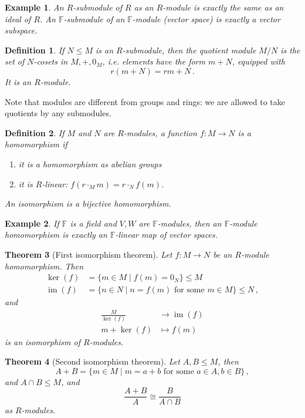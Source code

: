 \documentclass{article}
\theoremstyle{plain}\theoremheaderfont{\normalfont\itshape}\theorembodyfont{\rmfamily}\theoremseparator{.}\newtheorem*{rem}{Remark}\newtheorem*{ex}{Example}\newtheorem*{proof}{Proof}\newtheorem*{altp}{Alternative proof}\newtheorem*{nonex}{Non-Example}
\theoremstyle{plain}\theoremheaderfont{\normalfont\bfseries}\theorembodyfont{\rmfamily}\theoremseparator{.}\newtheorem{thm}{Theorem}[section]\newtheorem{lem}[thm]{Lemma}\newtheorem{prop}[thm]{Proposition}\newtheorem*{cor}{Corollary}\newtheorem{defn}[thm]{Definition}\newtheorem{clm}[thm]{Claim}\newtheorem{clminproof}{Claim}\newtheorem*{notn}{Notation}\newtheorem*{exer}{Exercise}\newtheorem*{lemnn}{Lemma}
\theoremstyle{break}\theoremheaderfont{\normalfont\itshape}\theorembodyfont{\rmfamily}\theoremseparator{.\medskip}\newtheorem*{proofskip}{Proof}\newtheorem*{exs}{Examples}\newtheorem*{rems}{Remarks}\newtheorem*{obs}{Observations}
\theoremstyle{break}\theoremheaderfont{\normalfont\bfseries}\theorembodyfont{\rmfamily}\theoremseparator{.\medskip}\newtheorem{lemskip}[thm]{Lemma}\newtheorem{defnskip}[thm]{Definition}\newtheorem{propskip}[thm]{Proposition}\newtheorem{thmskip}[thm]{Theorem}
\numberwithin{equation}{section}
\DeclareMathOperator*{\im}{im}
\newcommand{\FF}{\mathbb{F}}
\begin{document}
    \begin{ex}
        An \(R\)-submodule of \(R\) as an \(R\)-module is exactly the same as an ideal of \(R\). An \(\FF\)-submodule of an \(\FF\)-module (vector space) is exactly a vector subspace.
    \end{ex}
    \begin{defn}
        If \(N\le M\) is an \(R\)-submodule, then the \textit{quotient module} \(M/N\) is the set of \(N\)-cosets in \(M,+,0_M\), i.e. elements have the form \(m+N\), equipped with
        \[r(m+N)=rm+N\,.\]
        It is an \(R\)-module.
    \end{defn}
    Note that modules are different from groups and rings: we are allowed to take quotients by any submodules.
    \begin{defn}
        If \(M\) and \(N\) are \(R\)-modules, a function \(f:M\to N\) is a \textit{homomorphism} if
        \begin{enumerate}[topsep=0pt,label=(\roman*)]
            \item it is a homomorphism as abelian groups
            \item it is \(R\)-linear: \(f(r\cdot_M m)=r\cdot_N  f(m)\).
        \end{enumerate}

        An \textit{isomorphism} is a bijective homomorphism.
    \end{defn}
    \begin{ex}
        If \(\FF\) is a field and \(V,W\) are \(\FF\)-modules, then an \(\FF\)-module homomorphism is exactly an \(\FF\)-linear map of vector spaces.
    \end{ex}
    \begin{thm}[First isomorphism theorem]
        Let \(f:M\to N\) be an \(R\)-module homomorphism. Then
        \begin{align*}
            \ker(f)&=\{m\in M\mid f(m)=0_N\}\le M\\
            \im(f)&=\{n\in N\mid n=f(m)\text{ for some }m\in M\}\le N\,,
        \end{align*}
        and
        \begin{align*}
            \frac{M}{\ker(f)}&\longrightarrow\im(f)\\
            m+\ker(f)&\longmapsto f(m)
        \end{align*}
        is an isomorphism of \(R\)-modules.
    \end{thm}
    \begin{thm}[Second isomorphism theorem]
        Let \(A,B\le M\), then
        \[A+B=\{m\in M\mid m=a+b\text{ for some }a\in A,b\in B\}\,,\]
        and \(A\cap B\le M\), and
        \[\frac{A+B}{A}\cong\frac{B}{A\cap B}\]
        as \(R\)-modules.
    \end{thm}
\end{document}
